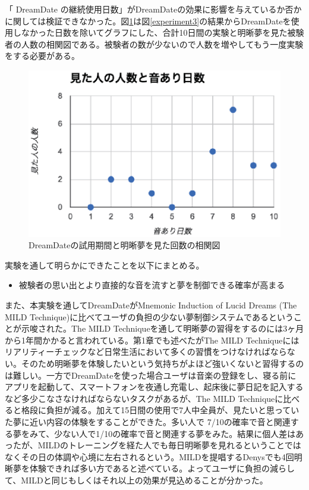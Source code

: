 「 DreamDate の継続使用日数」がDreamDateの効果に影響を与えているか否かに関しては検証できなかった。図\ref{dates}は図\ref{experiment3}の結果からDreamDateを使用しなかった日数を除いてグラフにした、合計10日間の実験と明晰夢を見た被験者の人数の相関図である。被験者の数が少ないので人数を増やしてもう一度実験をする必要がある。\\
\begin{figure}[htbp]
\begin{center}
\includegraphics[width=12cm]{eps/experimentDates.eps}
\caption{DreamDateの試用期間と明晰夢を見た回数の相関図}
\label{dates}
\end{center}
\end{figure}

実験を通して明らかにできたことを以下にまとめる。
\begin{itemize}
\item 被験者の思い出とより直接的な音を流すと夢を制御できる確率が高まる
\end{itemize}

また、本実験を通してDreamDateがMnemonic Induction of Lucid Dreams (The MILD Technique)に比べてユーザの負担の少ない夢制御システムであるということが示唆された。The MILD Techniqueを通して明晰夢の習得をするのには3ヶ月から1年間かかると言われている\cite{LaBerge}。第1章でも述べたがThe MILD Techniqueにはリアリティーチェックなど日常生活において多くの習慣をつけなければならない。そのため明晰夢を体験したいという気持ちがよほど強いくないと習得するのは難しい。一方でDreamDateを使った場合ユーザは音楽の登録をし、寝る前にアプリを起動して、スマートフォンを夜通し充電し、起床後に夢日記を記入するなど多少こなさなければならないタスクがあるが、The MILD Techniqueに比べると格段に負担が減る。加えて15日間の使用で7人中全員が、見たいと思っていた夢に近い内容の体験をすることができた。多い人で 7/10の確率で音と関連する夢をみて、少ない人で1/10の確率で音と関連する夢をみた。結果に個人差はあったが、MILDのトレーニングを経た人でも毎日明晰夢を見れるということではなくその日の体調や心境に左右されるという。MILDを提唱するDenysでも4回明晰夢を体験できれば多い方であると述べている\cite{LaBerge}。よってユーザに負担の減らして、MILDと同じもしくはそれ以上の効果が見込めることが分かった。

